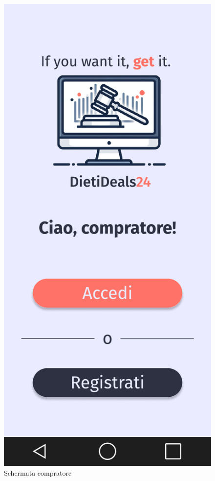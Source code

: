 \begin{figure}[!htb]
\begin{minipage}{0.32\textwidth}
            \includegraphics[width=.7\linewidth]{Immagini/Frames/5.pdf}
            \caption{Schermata compratore}
        \end{minipage}\hfill
    \end{figure}

    \clearpage
    
